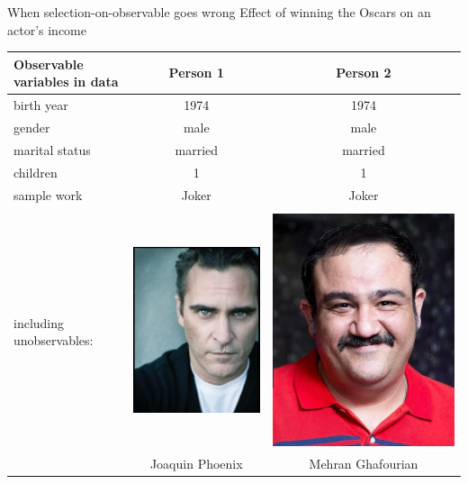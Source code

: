 \documentclass[handout]{beamer}
\begin{document}
\begin{frame}{When selection-on-observable goes wrong}
	Effect of winning the Oscars on an actor's income
	\begin{table}
		\begin{tabular}{|l|c|c|}
			\hline
			Observable variables in data& Person 1 & Person 2 \\
			\hline
			birth year & 1974 & 1974\\
			gender & male & male \\
			marital status & married & married \\
			children & 1&1\\
			sample work & Joker & Joker \pause\\
			\hline
			&&\\
			\begin{minipage}{.4\linewidth}
				{\color{red}	including unobservables:\vspace*{1.5cm} }
			\end{minipage}
			&	\includegraphics[width=0.15\linewidth]{./Figures/Phoniex2.png}&	\includegraphics[width=0.15\linewidth]{./Figures/ghafourian.jpg} \\
			&Joaquin Phoenix & Mehran Ghafourian \\
			\hline
		\end{tabular}
	\end{table}
	
\end{frame}
\end{document}

